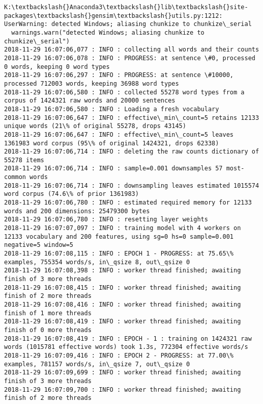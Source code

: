 \documentclass[11pt]{article}
\begin{document}
    \begin{Verbatim}[commandchars=\\\{\}]
K:\textbackslash{}Anaconda3\textbackslash{}lib\textbackslash{}site-packages\textbackslash{}gensim\textbackslash{}utils.py:1212: UserWarning: detected Windows; aliasing chunkize to chunkize\_serial
  warnings.warn("detected Windows; aliasing chunkize to chunkize\_serial")
2018-11-29 16:07:06,077 : INFO : collecting all words and their counts
2018-11-29 16:07:06,078 : INFO : PROGRESS: at sentence \#0, processed 0 words, keeping 0 word types
2018-11-29 16:07:06,297 : INFO : PROGRESS: at sentence \#10000, processed 712003 words, keeping 36988 word types
2018-11-29 16:07:06,580 : INFO : collected 55278 word types from a corpus of 1424321 raw words and 20000 sentences
2018-11-29 16:07:06,580 : INFO : Loading a fresh vocabulary
2018-11-29 16:07:06,647 : INFO : effective\_min\_count=5 retains 12133 unique words (21\% of original 55278, drops 43145)
2018-11-29 16:07:06,647 : INFO : effective\_min\_count=5 leaves 1361983 word corpus (95\% of original 1424321, drops 62338)
2018-11-29 16:07:06,714 : INFO : deleting the raw counts dictionary of 55278 items
2018-11-29 16:07:06,714 : INFO : sample=0.001 downsamples 57 most-common words
2018-11-29 16:07:06,714 : INFO : downsampling leaves estimated 1015574 word corpus (74.6\% of prior 1361983)
2018-11-29 16:07:06,780 : INFO : estimated required memory for 12133 words and 200 dimensions: 25479300 bytes
2018-11-29 16:07:06,780 : INFO : resetting layer weights
2018-11-29 16:07:07,097 : INFO : training model with 4 workers on 12133 vocabulary and 200 features, using sg=0 hs=0 sample=0.001 negative=5 window=5
2018-11-29 16:07:08,115 : INFO : EPOCH 1 - PROGRESS: at 75.65\% examples, 755354 words/s, in\_qsize 8, out\_qsize 0
2018-11-29 16:07:08,398 : INFO : worker thread finished; awaiting finish of 3 more threads
2018-11-29 16:07:08,415 : INFO : worker thread finished; awaiting finish of 2 more threads
2018-11-29 16:07:08,416 : INFO : worker thread finished; awaiting finish of 1 more threads
2018-11-29 16:07:08,419 : INFO : worker thread finished; awaiting finish of 0 more threads
2018-11-29 16:07:08,419 : INFO : EPOCH - 1 : training on 1424321 raw words (1015781 effective words) took 1.3s, 772304 effective words/s
2018-11-29 16:07:09,416 : INFO : EPOCH 2 - PROGRESS: at 77.00\% examples, 781157 words/s, in\_qsize 7, out\_qsize 0
2018-11-29 16:07:09,699 : INFO : worker thread finished; awaiting finish of 3 more threads
2018-11-29 16:07:09,700 : INFO : worker thread finished; awaiting finish of 2 more threads

\end{Verbatim}
\end{document}
